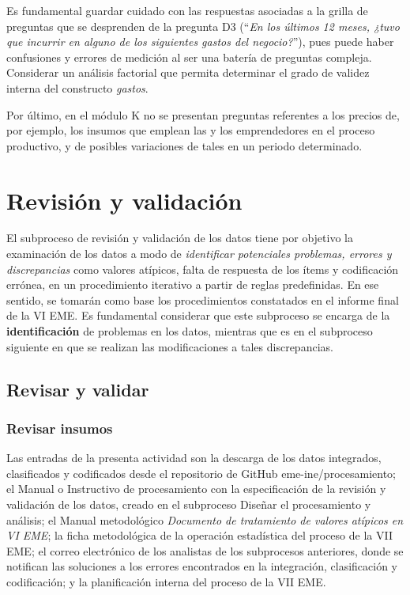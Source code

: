 \documentclass[
]{article}
\begin{document}
Es fundamental guardar cuidado con las respuestas asociadas a la grilla de preguntas que se desprenden de la pregunta D3 (``\emph{En los últimos 12 meses, ¿tuvo que incurrir en alguno de los siguientes gastos del negocio?}''), pues puede haber confusiones y errores de medición al ser una batería de preguntas compleja. Considerar un análisis factorial que permita determinar el grado de validez interna del constructo \emph{gastos}.

Por último, en el módulo K no se presentan preguntas referentes a los precios de, por ejemplo, los insumos que emplean las y los emprendedores en el proceso productivo, y de posibles variaciones de tales en un periodo determinado.

\newpage

\hypertarget{revisiuxf3n-y-validaciuxf3n}{%
\section{Revisión y validación}\label{revisiuxf3n-y-validaciuxf3n}}

El subproceso de revisión y validación de los datos tiene por objetivo la examinación de los datos a modo de \emph{identificar potenciales problemas, errores y discrepancias} como valores atípicos, falta de respuesta de los ítems y codificación errónea, en un procedimiento iterativo a partir de reglas predefinidas. En ese sentido, se tomarán como base los procedimientos constatados en el informe final de la VI EME. Es fundamental considerar que este subproceso se encarga de la \textbf{identificación} de problemas en los datos, mientras que es en el subproceso siguiente en que se realizan las modificaciones a tales discrepancias.

\hypertarget{revisar-y-validar}{%
\subsection{Revisar y validar}\label{revisar-y-validar}}

\hypertarget{revisar-insumos}{%
\subsubsection{Revisar insumos}\label{revisar-insumos}}

Las entradas de la presenta actividad son la descarga de los datos integrados, clasificados y codificados desde el repositorio de GitHub eme-ine/procesamiento; el Manual o Instructivo de procesamiento con la especificación de la revisión y validación de los datos, creado en el subproceso Diseñar el procesamiento y análisis; el Manual metodológico \emph{Documento de tratamiento de valores atípicos en VI EME}; la ficha metodológica de la operación estadística del proceso de la VII EME; el correo electrónico de los analistas de los subprocesos anteriores, donde se notifican las soluciones a los errores encontrados en la integración, clasificación y codificación; y la planificación interna del proceso de la VII EME.
\end{document}

